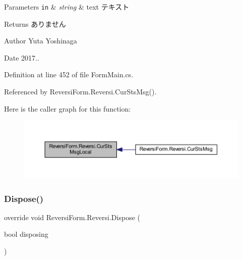 \begin{DoxyParams}[1]{Parameters}
\mbox{\tt in}  & {\em string} & text テキスト \\
\hline
\end{DoxyParams}
\begin{DoxyReturn}{Returns}
ありません 
\end{DoxyReturn}
\begin{DoxyAuthor}{Author}
Yuta Yoshinaga 
\end{DoxyAuthor}
\begin{DoxyDate}{Date}
2017.. 
\end{DoxyDate}


Definition at line 452 of file Form\+Main.\+cs.



Referenced by Reversi\+Form.\+Reversi.\+Cur\+Sts\+Msg().

Here is the caller graph for this function\+:\nopagebreak
\begin{figure}[H]
\begin{center}
\leavevmode
\includegraphics[width=350pt]{class_reversi_form_1_1_reversi_a934897d68f7709c32b6fd126351c5f05_icgraph}
\end{center}
\end{figure}
\mbox{\label{class_reversi_form_1_1_reversi_ac021c14c28e588c11445e460ec7e87d1}} 
\subsubsection{\texorpdfstring{Dispose()}{Dispose()}}
{\footnotesize\ttfamily override void Reversi\+Form.\+Reversi.\+Dispose (\begin{DoxyParamCaption}\item[{bool}]{disposing }\end{DoxyParamCaption})\hspace{0.3cm}{\ttfamily [protected]}}



